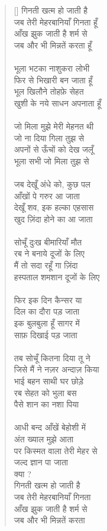 \begin{verse}[\versewidth]\texthindi{
गिनती खत्म हो जाती है\\
जब तेरी मेहरबानियाँ गिनता हूँ \\
आँख झुक जाती है शर्म से\\
जब और भी मिन्नतें करता हूँ \\
\\
भूला भटका नाशुकरा लोभी\\
फिर से भिखारी बन जाता हूँ \\
भूल खिलौने तोहफ़े सेहत\\
खुशी के नये साधन अपनाता हूँ \\
\\
जो मिला मुझे मेरी मेहनत थी\\
जो ना दिया गिला तुझ से\\
अपनों से ऊँचों को देख जलूँ\\
भूला सभी जो मिला तुझ से\\
\\
जब देखूँ अंधे को, कुछ पल\\
आँखों पे गरुर आ जाता\\
देखूँ शव, इक हल्का एहसास\\
खुद ज़िंदा होने का आ जाता\\
\\
सोचूँ दुःख बीमारियाँ मौत\\
रब ने बनाये दूजों के लिए\\
मैं तो सदा रहूँ गा ज़िंदा\\
हस्पताल शमशान दूजों के लिए\\
\\
फिर इक दिन कैन्सर या\\
दिल का दौरा पड़ जाता\\
इक बुलबुला हूँ सागर में\\
साफ़ दिखाई पड़ जाता\\
\\
तब सोचूँ कितना दिया तू ने\\
जिसे मैं ने नज़र अन्दाज़ किया\\
भाई बहन साथी घर छोड़े\\
रब सेहत को भुला बस\\
पैसे शान का नशा पिया\\
\\
आधी बन्द आँखें बेहोशी में\\
अंत ख्याल मुझे आता\\
पर किस्मत वाला तेरी मेहर से\\
जल्द ज्ञान पा जाता\\
क्या ?\\
गिनती खत्म हो जाती है\\
जब तेरी मेहरबानियाँ गिनता\\
आँख झुक जाती है शर्म से\\
जब और भी मिन्नतें करता
}
\end{verse}

